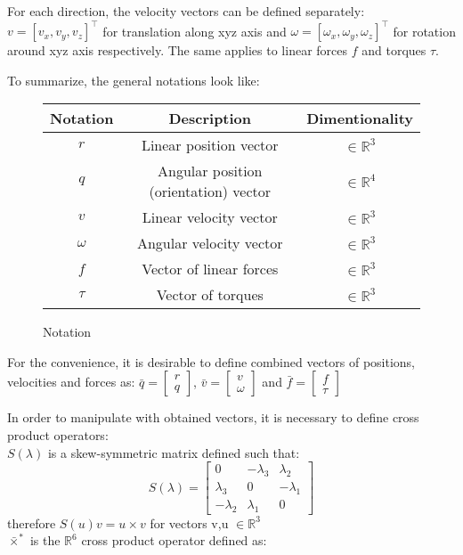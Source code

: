     For each direction, the velocity vectors can be defined separately: 
    $v = [v_x, v_y, v_z]^\top$ for translation along xyz axis and
    $\omega = [\omega_x, \omega_y, \omega_z]^\top$ for rotation around xyz axis respectively.
    The same applies to linear forces $f$ and torques $\tau$.

    To summarize, the general notations look like:

    \begin{figure}[H]
    \begin{tabular}{ccc}
        \hline Notation & Description & Dimentionality\\
        \hline
        $r$ & Linear position vector & $\in \mathbb{R}^{3}$ \\
        $q$ & Angular position (orientation) vector & $\in \mathbb{R}^{4}$\\
        $v$ & Linear velocity vector & $\in \mathbb{R}^{3}$\\
        $\omega$ & Angular velocity vector & $\in \mathbb{R}^{3}$\\
        $f$ & Vector of linear forces& $\in \mathbb{R}^{3}$ \\
        $\tau$ & Vector of torques& $\in \mathbb{R}^{3}$ \\
        \hline
        \end{tabular}
        \caption{Notation}
        \label{table:notation}
    \end{figure}

    For the convenience, it is desirable to define combined vectors of positions, velocities and forces as:
    $\bar{q} = \left[\begin{array}{ll}
        r \\
        q
    \end{array}\right]$, $\bar{v} = \left[\begin{array}{ll}
        v \\
        \omega
    \end{array}\right]$ and $\bar{f} = \left[\begin{array}{ll}
        f \\
        \tau
    \end{array}\right]$

    In order to manipulate with obtained vectors, it is necessary to define cross product operators:\\
    $S(\lambda)$ is a skew-symmetric matrix defined such that:
    $$
    S(\lambda)=\left[\begin{array}{ccc}
        0 & -\lambda_3 & \lambda_2 \\
        \lambda_3 & 0 & -\lambda_1 \\
        -\lambda_2 & \lambda_1 & 0
    \end{array}\right]
    $$ therefore $S(u)v = u \times v$ for vectors v,u $\in \mathbb{R}^{3}$ \\
    $\bar{\times}^*$ is the $\mathbb{R}^{6}$ cross product operator defined as: \\
    
